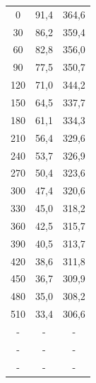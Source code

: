 \documentclass[10pt, twoside]{article}
\begin{document}
\begin{table}[H]
\begin{minipage}{0.3\textwidth}
\begin{tabular}{ccc}
            \midrule
            0   & 91,4 & 364,6 \\
            30  & 86,2 & 359,4 \\
            60  & 82,8 & 356,0 \\
            90  & 77,5 & 350,7 \\
            120 & 71,0 & 344,2 \\
            150 & 64,5 & 337,7 \\
            180 & 61,1 & 334,3 \\
            210 & 56,4 & 329,6 \\
            240 & 53,7 & 326,9 \\
            270 & 50,4 & 323,6 \\
            300 & 47,4 & 320,6 \\
            330 & 45,0 & 318,2 \\
            360 & 42,5 & 315,7 \\
            390 & 40,5 & 313,7 \\
            420 & 38,6 & 311,8 \\
            450 & 36,7 & 309,9 \\
            480 & 35,0 & 308,2 \\
            510 & 33,4 & 306,6 \\
            - & - & - \\
            - & - & - \\
            - & - & - \\
            \bottomrule
        \end{tabular}
        
        \label{tabla:muestra3}
    \end{minipage}
\end{table}
\end{document}
